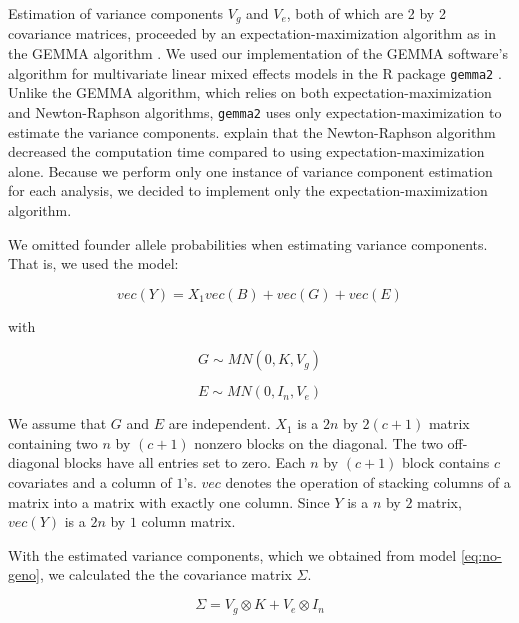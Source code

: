 \documentclass{book}
\begin{document}

Estimation of variance components $V_g$ and $V_e$, both of which are 2 by 2 covariance matrices, proceeded by an expectation-maximization algorithm as in the GEMMA algorithm \citep{zhou2014efficient}. We used our implementation of the GEMMA software's algorithm for multivariate linear mixed effects models in the R package \texttt{gemma2} \citep{gemma2}. Unlike the GEMMA algorithm, which relies on both expectation-maximization and Newton-Raphson algorithms, \texttt{gemma2} uses only expectation-maximization to estimate the variance components. \citet{zhou2014efficient} explain that the Newton-Raphson algorithm decreased the computation time compared to using expectation-maximization alone. Because we perform only one instance of variance component estimation for each analysis, we decided to implement only the expectation-maximization algorithm. 

We omitted founder allele probabilities when estimating variance components. That is, we used the model:

\begin{equation}
vec(Y) = X_1 vec(B) + vec(G) + vec(E)
\label{eq:no-geno}
\end{equation}

with 

\begin{equation}
G \sim MN(0, K, V_g)
\end{equation}

\begin{equation}
E \sim MN(0, I_n, V_e)
\end{equation}

We assume that $G$ and $E$ are independent. $X_1$ is a $2n$ by $2(c + 1)$ matrix containing two $n$ by $(c + 1)$ nonzero blocks on the diagonal. The two off-diagonal blocks have all entries set to zero. Each $n$ by $(c + 1)$ block contains $c$ covariates and a column of $1$'s. $vec$ denotes the operation of stacking columns of a matrix into a matrix with exactly one column. Since $Y$ is a $n$ by $2$ matrix, $vec(Y)$ is a $2n$ by $1$ column matrix.


With the estimated variance components, which we obtained from model \ref{eq:no-geno}, we calculated the the covariance matrix $\Sigma$.

\begin{equation}
\Sigma = V_g \otimes K + V_e \otimes I_n
\end{equation}
\end{document}

